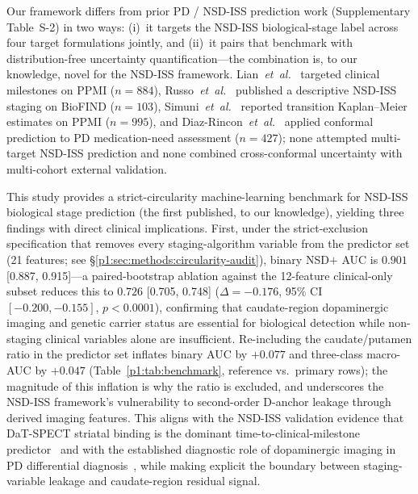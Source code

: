 Our framework differs from prior PD / NSD-ISS prediction work (Supplementary Table~S-2) in two ways: (i)~it targets the NSD-ISS biological-stage label across four target formulations jointly, and (ii)~it pairs that benchmark with distribution-free uncertainty quantification---the combination is, to our knowledge, novel for the NSD-ISS framework. Lian~\textit{et~al.}~\cite{adamedgraph} targeted clinical milestones on PPMI ($n{=}884$), Russo~\textit{et~al.}~\cite{russo2025} published a descriptive NSD-ISS staging on BioFIND ($n{=}103$), Simuni~\textit{et~al.}~\cite{simuni2025} reported transition Kaplan--Meier estimates on PPMI ($n{=}995$), and Diaz-Rincon~\textit{et~al.}~\cite{diazrincon2025} applied conformal prediction to PD medication-need assessment ($n{=}427$); none attempted multi-target NSD-ISS prediction and none combined cross-conformal uncertainty with multi-cohort external validation.

This study provides a strict-circularity machine-learning benchmark for NSD-ISS biological stage prediction (the first published, to our knowledge), yielding three findings with direct clinical implications. First, under the strict-exclusion specification that removes every staging-algorithm variable from the predictor set (21 features; see \S\ref{p1:sec:methods:circularity-audit}), binary NSD$+$ AUC is $0.901$ [0.887, 0.915]---a paired-bootstrap ablation against the 12-feature clinical-only subset reduces this to $0.726$ [0.705, 0.748] ($\Delta{=}-0.176$, 95\% CI $[-0.200, -0.155]$, $p{<}0.0001$), confirming that caudate-region dopaminergic imaging and genetic carrier status are essential for biological detection while non-staging clinical variables alone are insufficient. Re-including the caudate/putamen ratio in the predictor set inflates binary AUC by $+0.077$ and three-class macro-AUC by $+0.047$ (Table~\ref{p1:tab:benchmark}, reference vs.\ primary rows); the magnitude of this inflation is why the ratio is excluded, and underscores the NSD-ISS framework's vulnerability to second-order D-anchor leakage through derived imaging features. This aligns with the NSD-ISS validation evidence that DaT-SPECT striatal binding is the dominant time-to-clinical-milestone predictor~\cite{simuni2024val} and with the established diagnostic role of dopaminergic imaging in PD differential diagnosis~\cite{seibyl2018dat}, while making explicit the boundary between staging-variable leakage and caudate-region residual signal.

